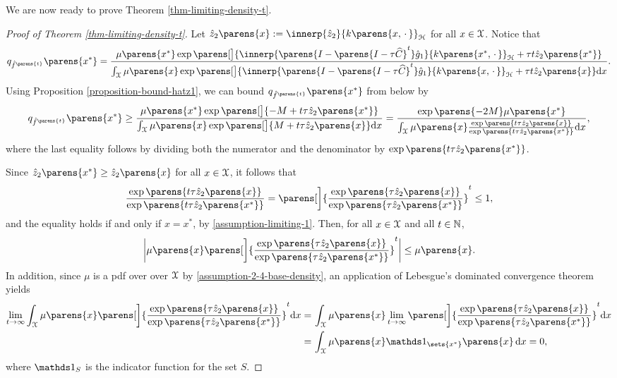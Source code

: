We are now ready to prove Theorem \ref{thm-limiting-density-t}. 

\begin{proof}[Proof of Theorem \ref{thm-limiting-density-t}]
	Let $\hat{z}_2 \parens{x} := \innerp{\hat{z}_2}{ k \parens{x, \,\cdot\,}}_{\calH}$ for all $x \in \mathcal{X}$. Notice that
	\begin{align*}
		q_{\hat{f}^{\parens{t}}} \parens{x^*} = \frac{\mu \parens{x^*} \exp \parens[\big]{\innerp{\parens{I - \parens{I - \tau \widehat{C}}^t} \hat{g}_1}{k \parens{x^*, \,\cdot\,}}_{\calH} + \tau t \hat{z}_2 \parens{x^*}}}{\int_{\calX} \mu \parens{x} \exp \parens[\big]{\innerp{\parens{I - \parens{I - \tau \widehat{C}}^t} \hat{g}_1}{k \parens{x, \,\cdot\,}}_{\calH} + \tau t \hat{z}_2 \parens{x}} \diff x}. 
	\end{align*}
	Using Proposition \ref{proposition-bound-hatz1}, we can bound $q_{\hat{f}^{\parens{t}}} \parens{x^*}$ from below by 
	\begin{align}\label{proof-thm-limiting-ft-1}
		q_{\hat{f}^{\parens{t}}} \parens{x^*} \ge \frac{ \mu \parens{x^*} \exp \parens[\big]{- M + t \tau \hat{z}_2 \parens{x^*}}}{\int_{\calX} \mu \parens{x} \exp \parens[\big]{M + t \tau \hat{z}_2 \parens{x}} \diff x} = \frac{\exp\parens{-2M} \mu \parens{x^*}}{\int_{\calX} \mu \parens{x} \frac{\exp \parens{t \tau \hat{z}_2 \parens{x} }}{\exp \parens{ t \tau \hat{z}_2 \parens{x^*}}} \diff x}, 
	\end{align}
	where the last equality follows by dividing both the numerator and the denominator by $\exp \parens{t \tau \hat{z}_2 \parens{x^*}}$. 
	
	Since $\hat{z}_2 \parens{x^*} \ge \hat{z}_2 \parens{x}$ for all $x \in \mathcal{X}$, it follows that 
	\begin{align*}
		\frac{\exp \parens{ t \tau \hat{z}_2 \parens{x}}}{\exp \parens{ t \tau \hat{z}_2 \parens{x^*}}} = \parens[\bigg]{\frac{\exp \parens{ \tau \hat{z}_2 \parens{x}}}{\exp \parens{\tau \hat{z}_2 \parens{x^*}}}}^t \le 1, 
	\end{align*}
	and the equality holds if and only if $x = x^*$, by \ref{assumption-limiting-1}. Then, for all $x \in \mathcal{X}$ and all $t \in \mathbb{N}$, 
	\begin{align*}
		\abs[\bigg]{\mu \parens{x} \parens[\bigg]{\frac{\exp\parens{\tau \hat{z}_2 \parens{x}}}{\exp \parens{\tau \hat{z}_2 \parens{x^*} }}}^t} \le \mu \parens{x}. 
	\end{align*}
	In addition, since $\mu$ is a pdf over over $\mathcal{X}$ by \ref{assumption-2-4-base-density}, an application of Lebesgue's dominated convergence theorem yields 
	\begin{align*}
		\lim_{t \to \infty} \int_{\calX} \mu \parens{x} \parens[\bigg]{\frac{\exp \parens{\tau \hat{z}_2 \parens{x}}}{\exp \parens{\tau \hat{z}_2 \parens{x^*} }}}^t \diff x 
		= & \, \int_{\calX} \mu \parens{x} \lim_{t \to \infty} \parens[\bigg]{\frac{\exp \parens{\tau \hat{z}_2 \parens{x}}}{\exp \parens{\tau \hat{z}_2 \parens{x^*}}}}^t \diff x \\ 
		= & \, \int_{\calX} \mu \parens{x} \indic_{\sets{x^*}} \parens{x} \, \diff x = 0, 
	\end{align*}
	where $\indic_S$ is the indicator function for the set $S$. 
	

\end{proof}

